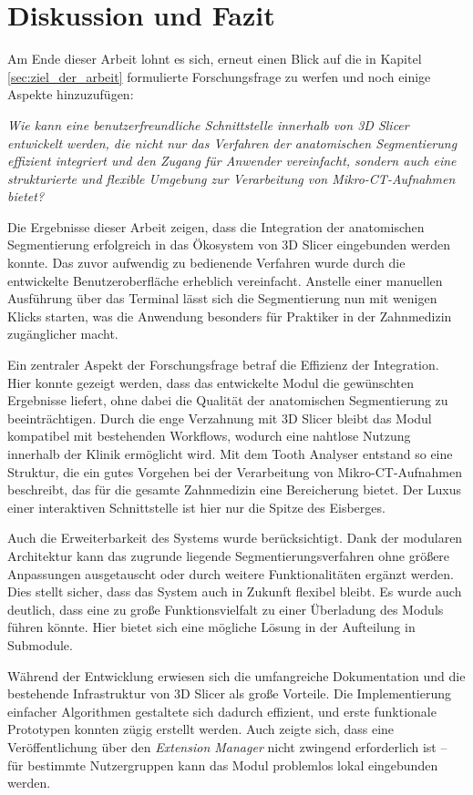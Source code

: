 \chapter{Diskussion und Fazit}
\label{chap:diskussion} Am Ende dieser Arbeit lohnt es sich, erneut einen Blick
auf die in Kapitel \ref{sec:ziel_der_arbeit} formulierte Forschungsfrage zu
werfen und noch einige Aspekte hinzuzufügen:

\textit{Wie kann eine benutzerfreundliche Schnittstelle innerhalb von 3D Slicer
entwickelt werden, die nicht nur das Verfahren der anatomischen Segmentierung effizient
integriert und den Zugang für Anwender vereinfacht, sondern auch eine
strukturierte und flexible Umgebung zur Verarbeitung von Mikro-CT-Aufnahmen
bietet?}

Die Ergebnisse dieser Arbeit zeigen, dass die Integration der anatomischen Segmentierung
erfolgreich in das Ökosystem von 3D Slicer eingebunden werden konnte. Das zuvor
aufwendig zu bedienende Verfahren wurde durch die entwickelte Benutzeroberfläche
erheblich vereinfacht. Anstelle einer manuellen Ausführung über das Terminal lässt
sich die Segmentierung nun mit wenigen Klicks starten, was die Anwendung
besonders für Praktiker in der Zahnmedizin zugänglicher macht.

Ein zentraler Aspekt der Forschungsfrage betraf die Effizienz der Integration. Hier
konnte gezeigt werden, dass das entwickelte Modul die gewünschten Ergebnisse
liefert, ohne dabei die Qualität der anatomischen Segmentierung zu beeinträchtigen.
Durch die enge Verzahnung mit 3D Slicer bleibt das Modul kompatibel mit
bestehenden Workflows, wodurch eine nahtlose Nutzung innerhalb der Klinik ermöglicht
wird. Mit dem Tooth Analyser entstand so eine Struktur, die ein gutes Vorgehen bei
der Verarbeitung von Mikro-CT-Aufnahmen beschreibt, das für die gesamte
Zahnmedizin eine Bereicherung bietet. Der Luxus einer interaktiven Schnittstelle
ist hier nur die Spitze des Eisberges.

Auch die Erweiterbarkeit des Systems wurde berücksichtigt. Dank der modularen
Architektur kann das zugrunde liegende Segmentierungsverfahren ohne größere
Anpassungen ausgetauscht oder durch weitere Funktionalitäten ergänzt werden. Dies
stellt sicher, dass das System auch in Zukunft flexibel bleibt. Es wurde auch deutlich,
dass eine zu große Funktionsvielfalt zu einer Überladung des Moduls führen
könnte. Hier bietet sich eine mögliche Lösung in der Aufteilung in Submodule.

Während der Entwicklung erwiesen sich die umfangreiche Dokumentation und die bestehende
Infrastruktur von 3D Slicer als große Vorteile. Die Implementierung einfacher
Algorithmen gestaltete sich dadurch effizient, und erste funktionale Prototypen konnten
zügig erstellt werden. Auch zeigte sich, dass eine Veröffentlichung über den \textit{Extension
Manager} nicht zwingend erforderlich ist – für bestimmte Nutzergruppen kann das
Modul problemlos lokal eingebunden werden.

